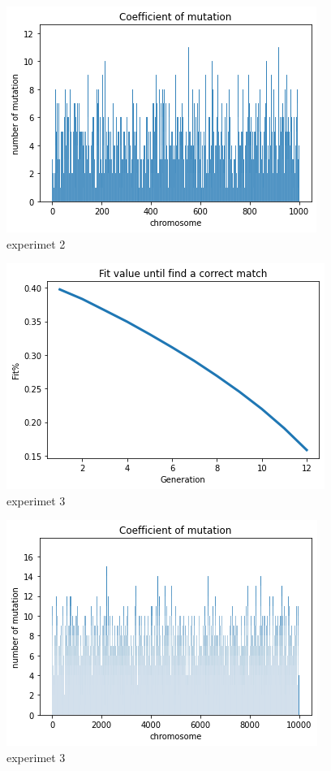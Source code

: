 \documentclass[letterpaper]{article} %
\begin{document}
\begin{figure}[h]
 \centering
 \includegraphics[scale = 0.5]{histpop1000.png}
 \caption{experimet 2}
\end{figure}
\begin{figure}[h]
\centering
    \includegraphics[scale = 0.5]{fitpop 10000.png}
    \caption{experimet 3}
\end{figure}
\begin{figure}[h]
 \centering
 \includegraphics[scale = 0.5]{histpop 10000.png}
 \caption{experimet 3}
\end{figure}
\end{document}
